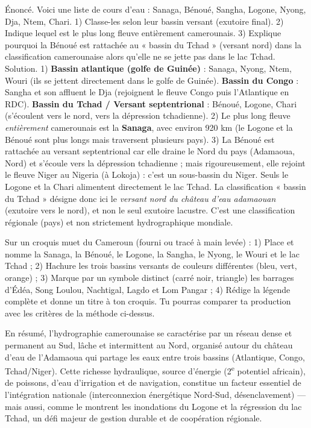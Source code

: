 \documentclass[11pt]{article}
\begin{document}
\begin{exoresolu}
Énoncé. Voici une liste de cours d'eau : Sanaga, Bénoué, Sangha, Logone, Nyong, Dja, Ntem, Chari. 1) Classe-les selon leur bassin versant (exutoire final). 2) Indique lequel est le plus long fleuve entièrement camerounais. 3) Explique pourquoi la Bénoué est rattachée au « bassin du Tchad » (versant nord) dans la classification camerounaise alors qu'elle ne se jette pas dans le lac Tchad.
\tcblower
Solution. 1) \textbf{Bassin atlantique (golfe de Guinée)} : Sanaga, Nyong, Ntem, Wouri (ils se jettent directement dans le golfe de Guinée). \textbf{Bassin du Congo} : Sangha et son affluent le Dja (rejoignent le fleuve Congo puis l'Atlantique en RDC). \textbf{Bassin du Tchad / Versant septentrional} : Bénoué, Logone, Chari (s'écoulent vers le nord, vers la dépression tchadienne). 2) Le plus long fleuve \emph{entièrement} camerounais est la \textbf{Sanaga}, avec environ 920 km (le Logone et la Bénoué sont plus longs mais traversent plusieurs pays). 3) La Bénoué est rattachée au versant septentrional car elle draine le Nord du pays (Adamaoua, Nord) et s'écoule vers la dépression tchadienne ; mais rigoureusement, elle rejoint le fleuve Niger au Nigeria (à Lokoja) : c'est un sous-bassin du Niger. Seuls le Logone et la Chari alimentent directement le lac Tchad. La classification « bassin du Tchad » désigne donc ici le \emph{versant nord du château d'eau adamaouan} (exutoire vers le nord), et non le seul exutoire lacustre. C'est une classification régionale (pays) et non strictement hydrographique mondiale.
\end{exoresolu}

\begin{exercice}
Sur un croquis muet du Cameroun (fourni ou tracé à main levée) : 1) Place et nomme la Sanaga, la Bénoué, le Logone, la Sangha, le Nyong, le Wouri et le lac Tchad ; 2) Hachure les trois bassins versants de couleurs différentes (bleu, vert, orange) ; 3) Marque par un symbole distinct (carré noir, triangle) les barrages d'Édéa, Song Loulou, Nachtigal, Lagdo et Lom Pangar ; 4) Rédige la légende complète et donne un titre à ton croquis. Tu pourras comparer ta production avec les critères de la méthode ci-dessus.
\end{exercice}

En résumé, l'hydrographie camerounaise se caractérise par un réseau dense et permanent au Sud, lâche et intermittent au Nord, organisé autour du château d'eau de l'Adamaoua qui partage les eaux entre trois bassins (Atlantique, Congo, Tchad/Niger). Cette richesse hydraulique, source d'énergie (2\textsuperscript{e} potentiel africain), de poissons, d'eau d'irrigation et de navigation, constitue un facteur essentiel de l'intégration nationale (interconnexion énergétique Nord-Sud, désenclavement) — mais aussi, comme le montrent les inondations du Logone et la régression du lac Tchad, un défi majeur de gestion durable et de coopération régionale.
\end{document}
